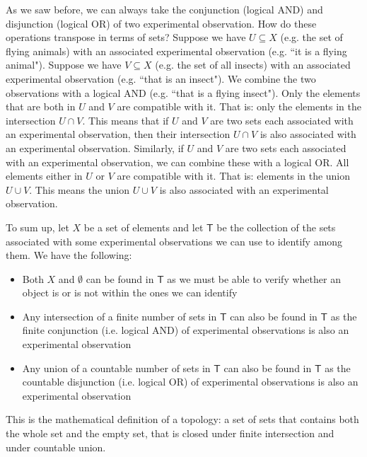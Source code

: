\documentclass[11pt,letterpaper,fleqn]{memoir} %
\begin{document}
As we saw before, we can always take the conjunction (logical AND) and disjunction (logical OR) of two experimental observation. How do these operations transpose in terms of sets? Suppose we have $U \subseteq X$ (e.g. the set of flying animals) with an associated experimental observation (e.g. ``it is a flying animal"). Suppose we have $V \subseteq X$ (e.g. the set of all insects) with an associated experimental observation (e.g. ``that is an insect"). We combine the two observations with a logical AND (e.g. ``that is a flying insect"). Only the elements that are both in $U$ and $V$ are compatible with it. That is: only the elements in the intersection $U \cap V$. This means that if $U$ and $V$ are two sets each associated with an experimental observation, then their intersection $U \cap V$ is also associated with an experimental observation. Similarly, if $U$ and $V$ are two sets each associated with an experimental observation, we can combine these with a logical OR. All elements either in $U$ or $V$ are compatible with it. That is: elements in the union $U \cup V$. This means the union $U \cup V$ is also associated with an experimental observation.

To sum up, let $X$ be a set of elements and let $\mathsf{T}$ be the collection of the sets associated with some experimental observations we can use to identify among them. We have the following:
\begin{itemize}
	\item Both $X$ and $\emptyset$ can be found in $\mathsf{T}$ as we must be able to verify whether an object is or is not within the ones we can identify
	\item Any intersection of a finite number of sets in $\mathsf{T}$ can also be found in $\mathsf{T}$ as the finite conjunction (i.e. logical AND) of experimental observations is also an experimental observation
	\item Any union of a countable number of sets in $\mathsf{T}$ can also be found in $\mathsf{T}$ as the countable disjunction (i.e. logical OR) of experimental observations is also an experimental observation
\end{itemize}
This is the mathematical definition of a topology: a set of sets that contains both the whole set and the empty set, that is closed under finite intersection and under countable union. 
\end{document}
